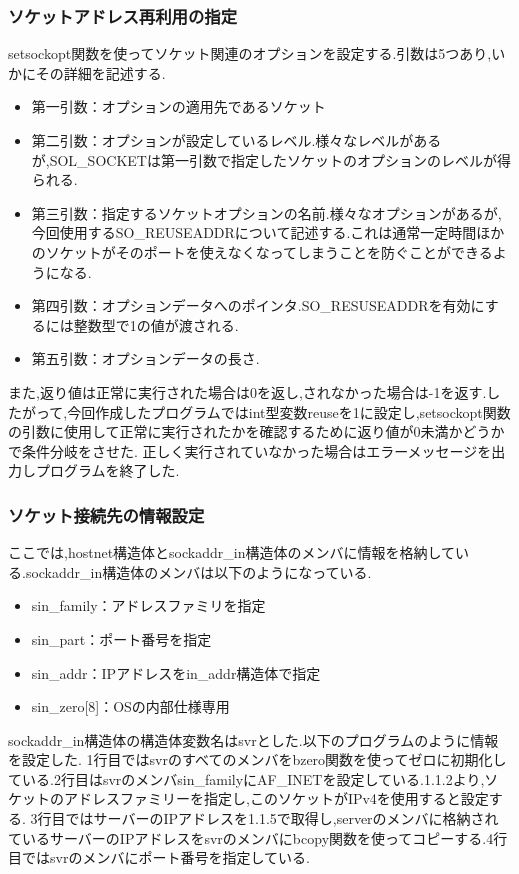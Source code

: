 \documentclass[dvipdfmx]{jarticle}
\begin{document}
\subsubsection{ソケットアドレス再利用の指定}
setsockopt関数を使ってソケット関連のオプションを設定する.引数は5つあり,いかにその詳細を記述する.\cite{6}\cite{7}
\begin{itemize}
    \item 第一引数：オプションの適用先であるソケット
    \item 第二引数：オプションが設定しているレベル.様々なレベルがあるが,SOL\_SOCKETは第一引数で指定したソケットのオプションのレベルが得られる.
    \item 第三引数：指定するソケットオプションの名前.様々なオプションがあるが,今回使用するSO\_REUSEADDRについて記述する.これは通常一定時間ほかのソケットがそのポートを使えなくなってしまうことを防ぐことができるようになる.\cite{8}
    \item 第四引数：オプションデータへのポインタ.SO\_RESUSEADDRを有効にするには整数型で1の値が渡される.
    \item 第五引数：オプションデータの長さ.
\end{itemize}
また,返り値は正常に実行された場合は0を返し,されなかった場合は-1を返す.したがって,今回作成したプログラムではint型変数reuseを1に設定し,setsockopt関数の引数に使用して正常に実行されたかを確認するために返り値が0未満かどうかで条件分岐をさせた.
正しく実行されていなかった場合はエラーメッセージを出力しプログラムを終了した.
\subsubsection{ソケット接続先の情報設定}
ここでは,hostnet構造体とsockaddr\_in構造体のメンバに情報を格納している.sockaddr\_in構造体のメンバは以下のようになっている.\cite{9}
\begin{itemize}
    \item sin\_family：アドレスファミリを指定
    \item sin\_part：ポート番号を指定
    \item sin\_addr：IPアドレスをin\_addr構造体で指定
    \item sin\_zero[8]：OSの内部仕様専用
\end{itemize}
sockaddr\_in構造体の構造体変数名はsvrとした.以下のプログラムのように情報を設定した.
1行目ではsvrのすべてのメンバをbzero関数を使ってゼロに初期化している.2行目はsvrのメンバsin\_familyにAF\_INETを設定している.1.1.2より,ソケットのアドレスファミリーを指定し,このソケットがIPv4を使用すると設定する.
3行目ではサーバーのIPアドレスを1.1.5で取得し,serverのメンバに格納されているサーバーのIPアドレスをsvrのメンバにbcopy関数を使ってコピーする.4行目ではsvrのメンバにポート番号を指定している.
\end{document}
